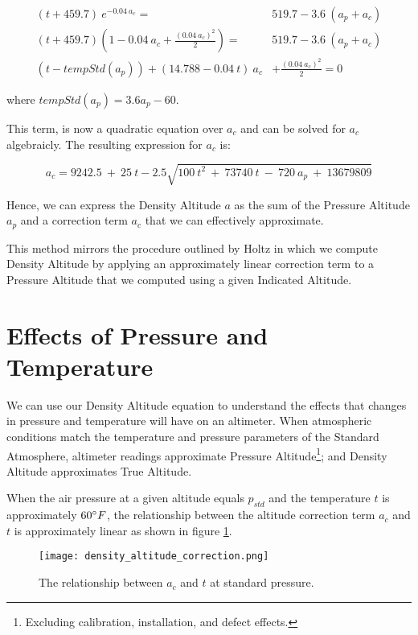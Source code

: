 \documentclass[10pt,a4paper]{article}
\begin{document}
\begin{align}
(t + 459.7)\ e^{- 0.04\ a_{c}} =& 519.7 - 3.6\ (a_{p} + a_{c})\\
(t + 459.7)(1 - 0.04\ a_{c} + \frac{(0.04\ a_{c})^2}{2}) =& 519.7 - 3.6\ (a_{p} + a_{c}) \\
\label{temp corr eqn}
(t - tempStd (a_p)) + (14.788 - 0.04\ t)\ a_c &+ \frac{(0.04\ a_c)^2}{2} = 0
\end{align}

where $tempStd (a_p) = 3.6 a_p - 60$.

This term, is now a quadratic equation over $a_{c}$ and can be solved for $a_{c}$ algebraicly. The resulting expression for $a_c$ is:

\begin{equation}
a_c = 9242.5\ +\ 25\ t - 2.5 \sqrt{100\ t^2\ +\ 73740\ t\ -\ 720\ a_p\ +\ 13679809}                                                                                                                                         
\end{equation}

Hence, we can express the Density Altitude $a$ as the sum of the Pressure Altitude $a_{p}$ and a correction term $a_{c}$ that we can effectively approximate.

This method mirrors the procedure outlined by Holtz in which we compute Density Altitude by applying an approximately linear correction term to a Pressure Altitude that we computed using a given Indicated Altitude.

\section{Effects of Pressure and Temperature}

We can use our Density Altitude equation to understand the effects that changes in pressure and temperature will have on an altimeter. When atmospheric conditions match the temperature and pressure parameters of the Standard Atmosphere, altimeter readings approximate Pressure Altitude\footnote{Excluding calibration, installation, and defect effects.}; and Density Altitude approximates True Altitude.

When the air pressure at a given altitude equals $p_{std}$ and the temperature $t$ is approximately $60\degree F$, the relationship between the altitude correction term $a_c$ and $t$ is approximately linear as shown in figure \ref{plot alt corr temp}.

\begin{figure}[H]
\texttt{[image: density\_altitude\_correction.png]}
\caption{The relationship between $a_c$ and $t$ at standard pressure.}
\label{plot alt corr temp}
\end{figure}
\end{document}
